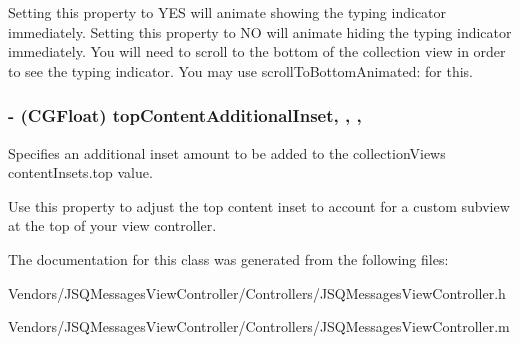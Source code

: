 Setting this property to {\ttfamily Y\+E\+S} will animate showing the typing indicator immediately. Setting this property to {\ttfamily N\+O} will animate hiding the typing indicator immediately. You will need to scroll to the bottom of the collection view in order to see the typing indicator. You may use {\ttfamily scroll\+To\+Bottom\+Animated\+:} for this. \hypertarget{interface_j_s_q_messages_view_controller_a43257bbb486c6cf7d31d3f0fe573147d}{}
\subsubsection[{top\+Content\+Additional\+Inset}]{\setlength{\rightskip}{0pt plus 5cm}-\/ (C\+G\+Float) top\+Content\+Additional\+Inset\hspace{0.3cm}{\ttfamily [read]}, {\ttfamily [write]}, {\ttfamily [nonatomic]}, {\ttfamily [assign]}}\label{interface_j_s_q_messages_view_controller_a43257bbb486c6cf7d31d3f0fe573147d}
Specifies an additional inset amount to be added to the collection\+View\textquotesingle{}s content\+Insets.\+top value.

Use this property to adjust the top content inset to account for a custom subview at the top of your view controller. 

The documentation for this class was generated from the following files\+:\begin{DoxyCompactItemize}
\item 
Vendors/\+J\+S\+Q\+Messages\+View\+Controller/\+Controllers/J\+S\+Q\+Messages\+View\+Controller.\+h\item 
Vendors/\+J\+S\+Q\+Messages\+View\+Controller/\+Controllers/J\+S\+Q\+Messages\+View\+Controller.\+m\end{DoxyCompactItemize}
